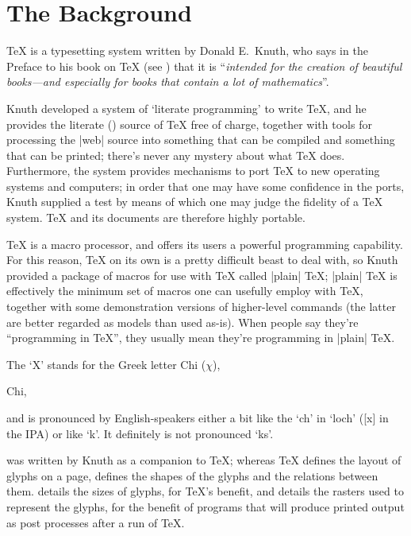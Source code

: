 
\section{The Background}


\TeX{} is a typesetting system written by Donald E.~Knuth, who
says in the Preface to his book on \TeX{}
(see )
that it is ``\emph{intended for the creation of beautiful books---and especially for books that contain a lot of mathematics}''.

Knuth developed a system of `literate programming' to write \TeX{},
and he provides the literate () source of \TeX{} free of charge,
together with tools for processing the |web| source into something
that can be compiled and something that can be printed; there's never
any mystery about what \TeX{} does.  Furthermore, the  system
provides mechanisms to port \TeX{} to new operating systems and
computers; in order that one may have some confidence in the ports,
Knuth supplied a test by means of which one may judge the fidelity of
a \TeX{} system.  \TeX{} and its documents are therefore highly
portable.

\TeX{} is a macro processor, and offers its users a powerful
programming capability.  For this reason, \TeX{} on its own is a
pretty difficult beast to deal with, so Knuth provided a package of
macros for use with \TeX{} called |plain| \TeX{}; |plain| \TeX{} is
effectively the minimum set of macros one can usefully employ with
\TeX{}, together with some demonstration versions of higher-level
commands (the latter are better regarded as models than used as-is).
When people say they're ``programming in \TeX{}'', they usually mean
they're programming in |plain| \TeX{}.


The `X' stands for the Greek letter
\htmlignore
Chi ($\chi$),
\endhtmlignore
\begin{htmlversion}
Chi,
\end{htmlversion}
and is pronounced by English-speakers either a bit like the `ch' in
`loch' ([x] in the IPA) or like `k'.  It definitely is not pronounced
`ks'.


\MF{} was written by Knuth as a companion to \TeX{}; whereas \TeX{}
defines the layout of glyphs on a page, \MF{} defines the shapes of
the glyphs and the relations between them.  \MF{} details the sizes of
glyphs, for \TeX{}'s benefit, and details the rasters used to
represent the glyphs, for the benefit of programs that will produce
printed output as post processes after a run of \TeX{}.

